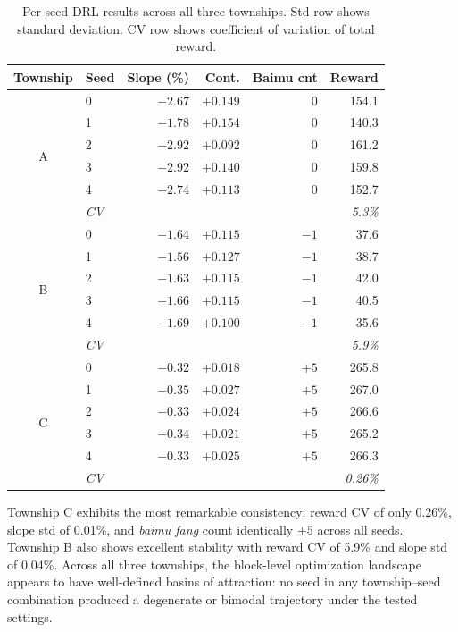 \documentclass[preprint,12pt]{elsarticle}
\begin{document}
\begin{table}[htbp]
\centering
\caption{Per-seed DRL results across all three townships. Std row shows standard deviation. CV row shows coefficient of variation of total reward.}
\label{tab:per_seed}
\begin{tabular}{clrrrr}
\toprule
Township & Seed & Slope (\%) & Cont. & Baimu cnt & Reward \\
\midrule
\multirow{6}{*}{A}
 & 0 & $-2.67$ & $+0.149$ & 0 & 154.1 \\
 & 1 & $-1.78$ & $+0.154$ & 0 & 140.3 \\
 & 2 & $-2.92$ & $+0.092$ & 0 & 161.2 \\
 & 3 & $-2.92$ & $+0.140$ & 0 & 159.8 \\
 & 4 & $-2.74$ & $+0.113$ & 0 & 152.7 \\
 & \textit{CV} & \multicolumn{4}{r}{\textit{5.3\%}} \\
\midrule
\multirow{6}{*}{B}
 & 0 & $-1.64$ & $+0.115$ & $-1$ & 37.6 \\
 & 1 & $-1.56$ & $+0.127$ & $-1$ & 38.7 \\
 & 2 & $-1.63$ & $+0.115$ & $-1$ & 42.0 \\
 & 3 & $-1.66$ & $+0.115$ & $-1$ & 40.5 \\
 & 4 & $-1.69$ & $+0.100$ & $-1$ & 35.6 \\
 & \textit{CV} & \multicolumn{4}{r}{\textit{5.9\%}} \\
\midrule
\multirow{6}{*}{C}
 & 0 & $-0.32$ & $+0.018$ & $+5$ & 265.8 \\
 & 1 & $-0.35$ & $+0.027$ & $+5$ & 267.0 \\
 & 2 & $-0.33$ & $+0.024$ & $+5$ & 266.6 \\
 & 3 & $-0.34$ & $+0.021$ & $+5$ & 265.2 \\
 & 4 & $-0.33$ & $+0.025$ & $+5$ & 266.3 \\
 & \textit{CV} & \multicolumn{4}{r}{\textit{0.26\%}} \\
\bottomrule
\end{tabular}
\end{table}

Township C exhibits the most remarkable consistency: reward CV of only 0.26\%, slope std of 0.01\%, and \textit{baimu fang} count identically $+5$ across all seeds. Township B also shows excellent stability with reward CV of 5.9\% and slope std of 0.04\%. Across all three townships, the block-level optimization landscape appears to have well-defined basins of attraction: no seed in any township--seed combination produced a degenerate or bimodal trajectory under the tested settings.
\end{document}

